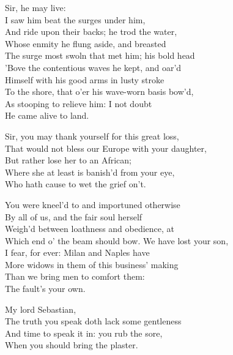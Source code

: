 \begin{verse_speech}[Francisco] 
Sir, he may live:\\
I saw him beat the surges under him,\\
And ride upon their backs; he trod the water,\\
Whose enmity he flung aside, and breasted\\
The surge most swoln that met him; his bold head\\
'Bove the contentious waves he kept, and oar'd\\
Himself with his good arms in lusty stroke\\
To the shore, that o'er his wave-worn basis bow'd,\\
As stooping to relieve him: I not doubt\\
He came alive to land.
\end{verse_speech}

\begin{verse_speech}[Sebastian] 
Sir, you may thank yourself for this great loss,\\
That would not bless our Europe with your daughter,\\
But rather lose her to an African;\\
Where she at least is banish'd from your eye,\\
Who hath cause to wet the grief on't.
\end{verse_speech}

\begin{verse_speech}[Sebastian] 
You were kneel'd to and importuned otherwise\\
By all of us, and the fair soul herself\\
Weigh'd between loathness and obedience, at\\
Which end o' the beam should bow. We have lost your son,\\
I fear, for ever: Milan and Naples have\\
More widows in them of this business' making\\
Than we bring men to comfort them:\\
The fault's your own.
\end{verse_speech}

\begin{verse_speech}[Gonzalo] My lord Sebastian,\\
The truth you speak doth lack some gentleness\\
And time to speak it in: you rub the sore,\\
When you should bring the plaster.
\end{verse_speech}


